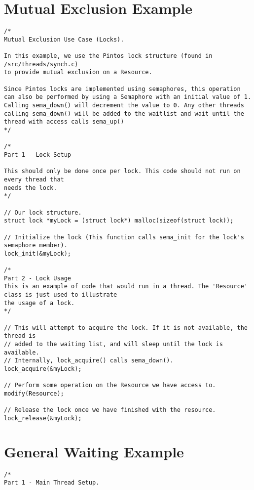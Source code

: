 \documentclass[11pt, letterpaper]{article}
\begin{document}
\pagebreak
\begin{appendices}

\section{Mutual Exclusion Example}
\begin{lstlisting}[frame=single,basicstyle=\footnotesize]
/*
Mutual Exclusion Use Case (Locks).

In this example, we use the Pintos lock structure (found in /src/threads/synch.c)
to provide mutual exclusion on a Resource.

Since Pintos locks are implemented using semaphores, this operation can also be performed by using a Semaphore with an initial value of 1. Calling sema_down() will decrement the value to 0. Any other threads calling sema_down() will be added to the waitlist and wait until the thread with access calls sema_up()
*/

/*
Part 1 - Lock Setup

This should only be done once per lock. This code should not run on every thread that
needs the lock.
*/

// Our lock structure.
struct lock *myLock = (struct lock*) malloc(sizeof(struct lock));

// Initialize the lock (This function calls sema_init for the lock's semaphore member).
lock_init(&myLock);

/*
Part 2 - Lock Usage
This is an example of code that would run in a thread. The 'Resource' class is just used to illustrate
the usage of a lock.
*/

// This will attempt to acquire the lock. If it is not available, the thread is
// added to the waiting list, and will sleep until the lock is available.
// Internally, lock_acquire() calls sema_down(). 
lock_acquire(&myLock);

// Perform some operation on the Resource we have access to.
modify(Resource);

// Release the lock once we have finished with the resource.
lock_release(&myLock);
\end{lstlisting}

\pagebreak

\section{General Waiting Example}
\begin{lstlisting}[frame=single,basicstyle=\footnotesize]
/*
Part 1 - Main Thread Setup.


\end{lstlisting}
\end{appendices}
\end{document}
